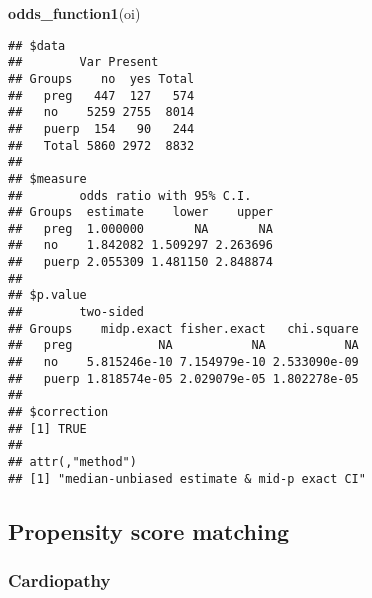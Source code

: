 \documentclass[
]{article}
\newenvironment{Shaded}{\begin{snugshade}}{\end{snugshade}}
\newcommand{\KeywordTok}[1]{\textcolor[rgb]{0.13,0.29,0.53}{\textbf{#1}}}
\newcommand{\NormalTok}[1]{#1}
\newcommand{\OperatorTok}[1]{\textcolor[rgb]{0.81,0.36,0.00}{\textbf{#1}}}
\newcommand{\StringTok}[1]{\textcolor[rgb]{0.31,0.60,0.02}{#1}}
\begin{document}
\begin{Shaded}
\begin{Highlighting}[]
\KeywordTok{odds_function1}\NormalTok{(oi)}
\end{Highlighting}
\end{Shaded}

\begin{verbatim}
## $data
##        Var Present
## Groups    no  yes Total
##   preg   447  127   574
##   no    5259 2755  8014
##   puerp  154   90   244
##   Total 5860 2972  8832
## 
## $measure
##        odds ratio with 95% C.I.
## Groups  estimate    lower    upper
##   preg  1.000000       NA       NA
##   no    1.842082 1.509297 2.263696
##   puerp 2.055309 1.481150 2.848874
## 
## $p.value
##        two-sided
## Groups    midp.exact fisher.exact   chi.square
##   preg            NA           NA           NA
##   no    5.815246e-10 7.154979e-10 2.533090e-09
##   puerp 1.818574e-05 2.029079e-05 1.802278e-05
## 
## $correction
## [1] TRUE
## 
## attr(,"method")
## [1] "median-unbiased estimate & mid-p exact CI"
\end{verbatim}

\hypertarget{propensity-score-matching-2}{%
\subsection{Propensity score
matching}\label{propensity-score-matching-2}}

\hypertarget{cardiopathy-1}{%
\subsubsection{Cardiopathy}\label{cardiopathy-1}}

\begin{Shaded}
\end{Shaded}
\end{document}
